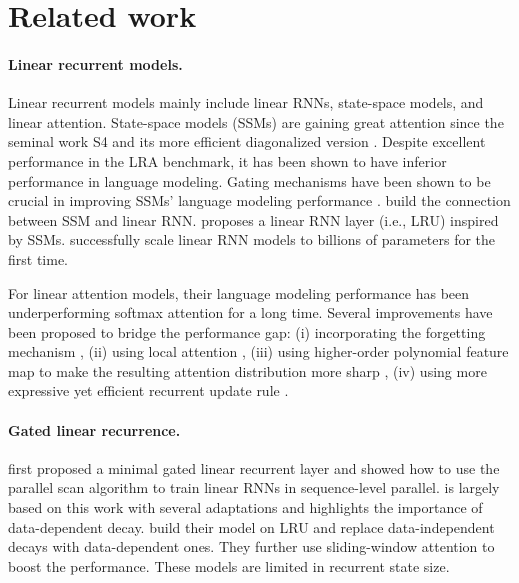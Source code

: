 \section{Related work}
\paragraph{Linear recurrent models.} Linear recurrent models mainly include linear RNNs, state-space models, and linear attention.  State-space models (SSMs) are gaining great attention since the seminal work S4 \citep{s4} and its more efficient diagonalized version \citep{Gu2022OnTP}. Despite excellent performance in the LRA benchmark, it has been shown to have inferior performance in language modeling. Gating mechanisms have been shown to be crucial in improving SSMs' language modeling performance \citep{gss, pretrain_wo_attn, Gu2023MambaLS}.  \cite{Gupta2022SimplifyingAU} build the connection between SSM and linear RNN.  \cite{LRU} proposes a linear RNN layer (i.e., LRU) inspired by SSMs. \cite{rwkv} successfully scale linear RNN models to billions of parameters for the first time. 

For linear attention models, their language modeling performance has been underperforming softmax attention for a long time. Several improvements have been proposed to bridge the performance gap: (i) incorporating the forgetting mechanism \citep{peng2021random,linear-xmr-fastweight,sun2023retentive,qin2023scaling, GLA, Peng2024EagleAF}, (ii) using local attention \citep{qin2022devil, orthogonal_memory, based, Ren2024SambaSH}, (iii) using higher-order polynomial feature map \citep{based, polysketch} to make the resulting attention distribution more sharp \citep{Hedgehog}, (iv) using more expressive yet efficient recurrent update rule \citep{linear-xmr-fastweight, yang2024delta, Liu2024LonghornSS, Sun2024LearningT}.

\paragraph{Gated linear recurrence.} \cite{parallel-martin} first proposed a minimal gated linear recurrent layer and showed how to use the parallel scan algorithm to train linear RNNs in sequence-level parallel. \cite{HGRN} is largely based on this work with several adaptations and highlights the importance of data-dependent decay. \cite{Griffin} build their model on LRU \citep{LRU} and replace data-independent decays with data-dependent ones. They further use sliding-window attention to boost the performance.  These models are limited in recurrent state size. 

